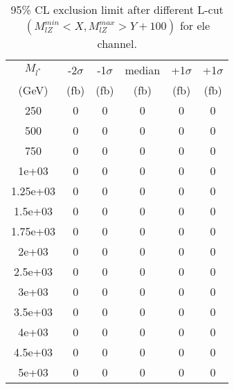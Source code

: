 \documentclass[]{article}
\begin{document}
\begin{table}
\begin{center}
\begin{tabular}{cccccc}
\hline 
\hline 
$M_{l^*}$ & -2$\sigma$ & -1$\sigma$ & median & +1$\sigma$ & +1$\sigma$\\ 
(GeV) & (fb) & (fb) & (fb) & (fb) & (fb)  \\ 
\hline 
\hline 
250 & 0 & 0 & 0 & 0 & 0\\
500 & 0 & 0 & 0 & 0 & 0\\
750 & 0 & 0 & 0 & 0 & 0\\
1e+03 & 0 & 0 & 0 & 0 & 0\\
1.25e+03 & 0 & 0 & 0 & 0 & 0\\
1.5e+03 & 0 & 0 & 0 & 0 & 0\\
1.75e+03 & 0 & 0 & 0 & 0 & 0\\
2e+03 & 0 & 0 & 0 & 0 & 0\\
2.5e+03 & 0 & 0 & 0 & 0 & 0\\
3e+03 & 0 & 0 & 0 & 0 & 0\\
3.5e+03 & 0 & 0 & 0 & 0 & 0\\
4e+03 & 0 & 0 & 0 & 0 & 0\\
4.5e+03 & 0 & 0 & 0 & 0 & 0\\
5e+03 & 0 & 0 & 0 & 0 & 0\\
\hline 
\end{tabular}
\caption{95\% CL exclusion limit after different L-cut $(M_{lZ}^{min} < X, M_{lZ}^{max} > Y + 100)$ for ele channel.}
\label{tab:limit_electron}
\end{center}
\end{table}
\end{document}
